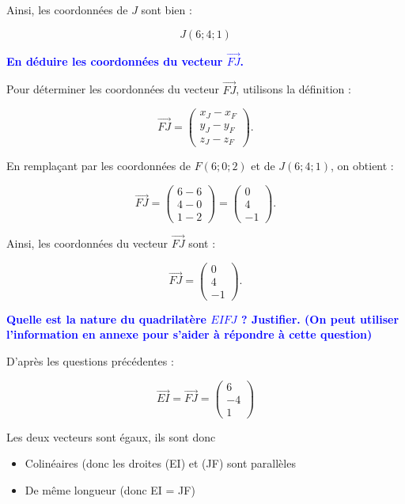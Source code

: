 \documentclass{exam}
\begin{document}
\begin{questions}
Ainsi, les coordonnées de $J$ sont bien :

\[
J(6 ; 4 ; 1)
\]

    \question[0.5] \textbf{\textcolor{blue}{En déduire les coordonnées du vecteur $\overrightarrow{FJ}$.}}

    Pour déterminer les coordonnées du vecteur $\overrightarrow{FJ}$, utilisons la définition :

    \[
    \overrightarrow{FJ} = 
    \begin{pmatrix}
    x_J - x_F \\
    y_J - y_F \\
    z_J - z_F
    \end{pmatrix}.
    \]
    
    En remplaçant par les coordonnées de $F(6 ; 0 ; 2)$ et de $J(6 ; 4 ; 1)$, on obtient :
    
    \[
    \overrightarrow{FJ} = 
    \begin{pmatrix}
    6 - 6 \\
    4 - 0 \\
    1 - 2
    \end{pmatrix}
    =
    \begin{pmatrix}
    0 \\
    4 \\
    -1
    \end{pmatrix}.
    \]
    
    Ainsi, les coordonnées du vecteur $\overrightarrow{FJ}$ sont :
    
    \[
    \overrightarrow{FJ} = \begin{pmatrix}
    0 \\
    4 \\
    -1
    \end{pmatrix}.
    \]

    \question[1] \textbf{\textcolor{blue}{Quelle est la nature du quadrilatère $EIFJ$ ? Justifier. (On peut utiliser l'information en annexe pour s'aider à répondre à cette question)}}

    D'après les questions précédentes : 

    \[
      \overrightarrow{EI} = \overrightarrow{FJ} = \begin{pmatrix}
        6 \\
        -4 \\
        1
        \end{pmatrix}
  \]

    Les deux vecteurs sont égaux, ils sont donc 
    \begin{itemize}
      \item Colinéaires (donc les droites (EI) et (JF) sont parallèles
      \item De même longueur (donc EI = JF)
    \end{itemize}


\end{questions}
\end{document}
